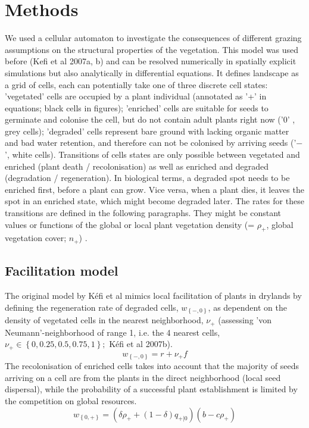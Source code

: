 \section{Methods}
We used a cellular automaton to investigate the consequences of different grazing assumptions on the structural properties of the vegetation. This model was used before (Kefi et al 2007a, b) and can be resolved numerically in spatially explicit simulations but also analytically in differential equations. It defines landscape as a grid of cells, each can potentially take one of three discrete cell states: 'vegetated' cells are occupied by a plant individual (annotated as '+' in equations; black cells in figures); 'enriched' cells are suitable for seeds to germinate and colonise the cell, but do not contain adult plants right now  ('0' , grey cells); 'degraded' cells represent bare ground with lacking organic matter and bad water retention, and therefore can not be colonised by arriving seeds  ('$-$', white cells).
Transitions of cells states are only possible between vegetated and enriched (plant death / recolonisation) as well as enriched and degraded (degradation / regeneration). In biological terms, a degraded spot needs to be enriched first, before a plant can grow. Vice versa, when a plant dies, it leaves the spot in an enriched state, which might become degraded later. The rates for these transitions are defined in the following paragraphs. They might be constant values or functions of the global or local plant vegetation density (= $\rho_+$, global vegetation cover; $n_+$) .

\subsection{Facilitation model}
The original model by K\'efi et al mimics local facilitation of plants in drylands by defining the regeneration rate of degraded cells, $w_{ \left\{-,0 \right\} }$, as dependent on the density of vegetated cells in the nearest neighborhood, $\nu_+$ (assessing 'von Neumann'-neighborhood of range 1, i.e. the 4 nearest cells, $\nu_+ \in \left\{ 0, 0.25, 0.5, 0.75, 1 \right\}; $ K\'efi et al 2007b).
\begin{equation}
	w_{ \left\{-,0 \right\} } = r + \nu_{+} f
\end{equation}
The recolonisation of enriched cells takes into account that the majority of seeds arriving on a cell are from the plants in the direct neighborhood (local seed dispersal), while the probability of a successful plant establishment is limited by the competition on global resources.
\begin{equation}
	w_{ \left\{0,+ \right\} } = \left( \delta\rho_+ + \left( 1 - \delta \right)q_{+|0}\right) \left(b-c\rho_+ \right)
\end{equation}

